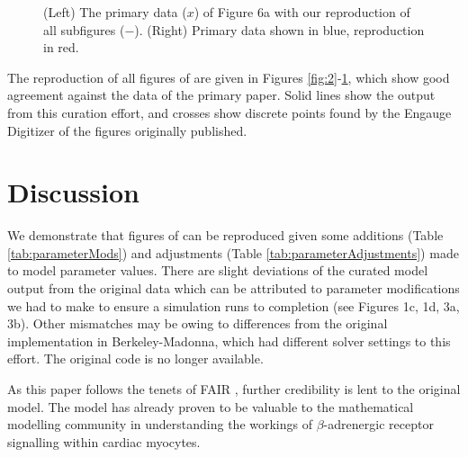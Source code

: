 \documentclass[fleqn,10pt]{physiome}
\begin{document}
\begin{figure}
\begin{subfigure}[b]{0.49\textwidth}
    \end{subfigure}
    \caption{(Left) The primary data ($x$) of Figure 6a with our reproduction of all subfigures ($-$). (Right) Primary data shown in blue, reproduction in red.}
    \label{fig:6}
\end{figure}

The reproduction of all figures of \cite{saucerman2003} are given in Figures \ref{fig:2}-\ref{fig:6}, which show good agreement against the data of the primary paper. Solid lines show the output from this curation effort, and crosses show discrete points found by the Engauge Digitizer of the figures originally published.

\section{Discussion}

We demonstrate that figures of \cite{saucerman2003} can be reproduced given some additions (Table \ref{tab:parameterMods}) and adjustments (Table \ref{tab:parameterAdjustments}) made to model parameter values. There are slight deviations of the curated model output from the original data which can be attributed to parameter modifications we had to make to ensure a simulation runs to completion (see Figures 1c, 1d, 3a, 3b). Other mismatches may be owing to differences from the original implementation in Berkeley-Madonna, which had different solver settings to this effort. The original code is no longer available. 

As this paper follows the tenets of FAIR \citep{wilkinson2016fair}, further credibility is lent to the original model. The model has already proven to be valuable to the mathematical modelling community in understanding the workings of $\beta$-adrenergic receptor signalling within cardiac myocytes.



\end{document}
